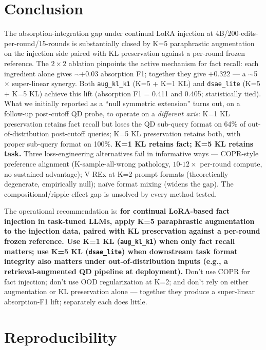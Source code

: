 \documentclass[11pt]{article}
\newcommand{\code}[1]{\texttt{\small #1}}
\begin{document}
\section{Conclusion}

The absorption-integration gap under continual LoRA injection at
4B/200-edits-per-round/15-rounds is substantially closed by K=5
paraphrastic augmentation on the injection side paired with KL
preservation against a per-round frozen reference. The $2\times2$
ablation pinpoints the active mechanism for fact recall: each ingredient
alone gives $\sim$$+0.03$ absorption F1; together they give $+0.322$ ---
a $\sim$5$\times$ super-linear synergy. Both \code{aug\_kl\_k1}
(K=5 + K=1 KL) and \code{dsae\_lite} (K=5 + K=5 KL) achieve this lift
(absorption F1 = 0.411 and 0.405; statistically tied). What we initially
reported as a ``null symmetric extension'' turns out, on a follow-up
post-cutoff QD probe, to operate on a \emph{different axis}: K=1 KL
preservation retains fact recall but loses the QD sub-query format on
64\% of out-of-distribution post-cutoff queries; K=5 KL preservation
retains both, with proper sub-query format on 100\%.
\textbf{K=1 KL retains fact; K=5 KL retains task.} Three loss-engineering
alternatives fail in informative ways --- COPR-style preference alignment
(K-sample-all-wrong pathology, $10$-$12\times$ per-round compute, no
sustained advantage); V-REx at K=2 prompt formats (theoretically
degenerate, empirically null); na\"ive format mixing (widens the gap).
The compositional/ripple-effect gap is unsolved by every method tested.

The operational recommendation is: \textbf{for continual LoRA-based fact
injection in task-tuned LLMs, apply K=5 paraphrastic augmentation to the
injection data, paired with KL preservation against a per-round frozen
reference. Use K=1 KL (\code{aug\_kl\_k1}) when only fact recall matters;
use K=5 KL (\code{dsae\_lite}) when downstream task format integrity also
matters under out-of-distribution inputs (e.g., a retrieval-augmented QD
pipeline at deployment).} Don't use COPR for fact injection; don't use
OOD regularization at K=2; and don't rely on either augmentation or KL
preservation alone --- together they produce a super-linear absorption-F1
lift; separately each does little.

\section*{Reproducibility}
\end{document}
